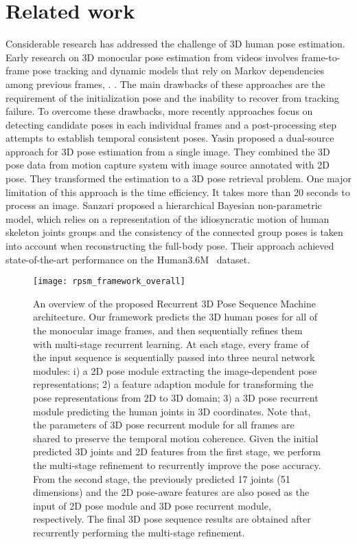 \documentclass[10pt,twocolumn,letterpaper]{article}
\begin{document}
\section{Related work}
Considerable research has addressed the challenge of 3D human pose estimation. Early research on 3D monocular pose estimation from videos involves frame-to-frame pose tracking and dynamic models that rely on Markov dependencies among previous frames, \eg. \cite{wang2014robust,sigal2012loose}. The main drawbacks of these approaches are the requirement of the initialization pose and the inability to recover from tracking failure. To overcome these drawbacks, more recently approaches \cite{andriluka2010monocular,BurgosArtizzuBMVC13PoseNms} focus on detecting candidate poses in each individual frames and a post-processing step attempts to establish temporal consistent poses. Yasin \etal \cite{yasin2016dual} proposed a dual-source approach for 3D pose estimation from a single image. They combined the 3D pose data from motion capture system with image source annotated with 2D pose. They transformed the estimation to a 3D pose retrieval problem. One major limitation of this approach is the time efficiency. It takes more than 20 seconds to process an image. Sanzari \etal \cite{DBLP:conf/eccv/SanzariNP16} proposed a hierarchical Bayesian non-parametric model, which relies on a representation of the idiosyncratic motion of human skeleton joints groups and the consistency of the connected group poses is taken into account when reconstructing the full-body pose. Their approach achieved state-of-the-art performance on the Human3.6M~\cite{huamn3.6m} dataset.

\begin{figure*}[ht]
\centering
	\texttt{[image: rpsm\_framework\_overall]}
	\vspace{-10pt}
	\caption{An overview of the proposed Recurrent 3D Pose Sequence Machine architecture. Our framework predicts the 3D human poses for all of the monocular image frames, and then sequentially refines them with multi-stage recurrent learning. At each stage, every frame of the input sequence is sequentially passed into three neural network modules: i) a 2D pose module extracting the image-dependent pose representations; 2) a feature adaption module for transforming the pose representations from 2D to 3D domain; 3) a 3D pose recurrent module predicting the human joints in 3D coordinates. Note that, the parameters of 3D pose recurrent module for all frames are shared to preserve the temporal motion coherence. Given the initial predicted 3D joints and 2D features from the first stage, we perform the multi-stage refinement to recurrently improve the pose accuracy. From the second stage, the previously predicted 17 joints (51 dimensions) and the 2D pose-aware features are also posed as the input of 2D pose module and 3D pose recurrent module, respectively. The final 3D pose sequence results are obtained after recurrently performing the multi-stage refinement. }
	\label{fig:framework}
	\vspace{-12pt}
\end{figure*}
\end{document}
